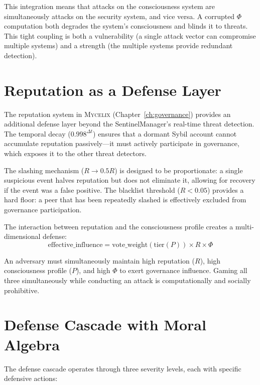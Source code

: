 \documentclass[12pt]{book}
\newcommand{\mycelix}{\textsc{Mycelix}}
\begin{document}
This integration means that attacks on the consciousness system are simultaneously attacks on the security system, and vice versa. A corrupted $\Phi$ computation both degrades the system's consciousness and blinds it to threats. This tight coupling is both a vulnerability (a single attack vector can compromise multiple systems) and a strength (the multiple systems provide redundant detection).

\section{Reputation as a Defense Layer}

The reputation system in \mycelix{} (Chapter~\ref{ch:governance}) provides an additional defense layer beyond the SentinelManager's real-time threat detection. The temporal decay ($0.998^{\Delta t}$) ensures that a dormant Sybil account cannot accumulate reputation passively---it must actively participate in governance, which exposes it to the other threat detectors.

The slashing mechanism ($R \to 0.5R$) is designed to be proportionate: a single suspicious event halves reputation but does not eliminate it, allowing for recovery if the event was a false positive. The blacklist threshold ($R < 0.05$) provides a hard floor: a peer that has been repeatedly slashed is effectively excluded from governance participation.

The interaction between reputation and the consciousness profile creates a multi-dimensional defense:
\begin{equation}
\text{effective\_influence} = \text{vote\_weight}(\text{tier}(P)) \times R \times \Phi
\end{equation}

An adversary must simultaneously maintain high reputation ($R$), high consciousness profile ($P$), and high $\Phi$ to exert governance influence. Gaming all three simultaneously while conducting an attack is computationally and socially prohibitive.

\section{Defense Cascade with Moral Algebra}

The defense cascade operates through three severity levels, each with specific defensive actions:
\end{document}
